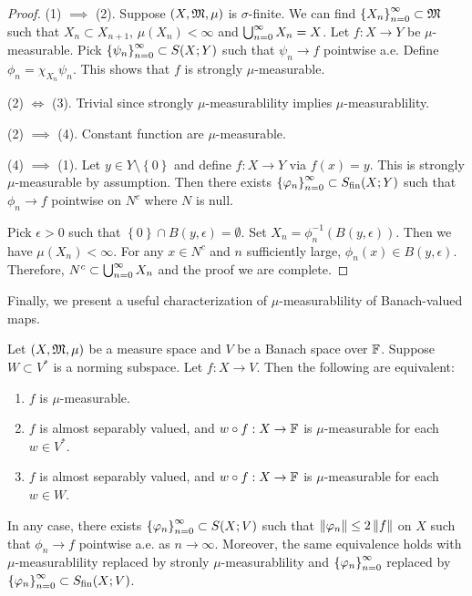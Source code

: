 \documentclass[a4paper]{article}
\begin{document}
\begin{proof}
  (1) $\implies$ (2). Suppose $(X, \mathfrak{M}, \mu)$ is 
  $\sigma$-finite. We can find $\left\{ X_n \right\}_{n=0}^\infty 
  \subset \mathfrak{M}$ such that $X_n \subset X_{n+1}$, 
  $\mu(X_n) < \infty$ and $\bigcup_{n=0}^\infty X_n = X$. 
  Let $f: X \to Y$ be $\mu$-measurable. Pick 
  $\left\{ \psi_n \right\}_{n=0}^\infty \subset S(X; Y)$ such that
  $\psi_n \to f$ pointwise a.e. Define 
  $\phi_n = \chi_{X_n} \psi_n$. This shows that 
  $f$ is strongly $\mu$-measurable.

  (2) $\iff$ (3). Trivial since strongly $\mu$-measurablility
  implies $\mu$-measurablility.

  (2) $\implies$ (4). Constant function are $\mu$-measurable.

  (4) $\implies$ (1). Let $y \in Y \setminus \left\{ 0 \right\}$
  and define $f : X \to Y$ via $f(x) = y$. This 
  is strongly $\mu$-measurable by assumption. 
  Then there exists $\left\{ \varphi_n \right\}_{n=0}^\infty \subset S_{\text{fin}}(X; Y)$ 
  such that $\phi_n \to f$ pointwise on $N^c$ where 
  $N$ is null. 

  Pick $\epsilon > 0$ such that $\left\{ 0 \right\} 
  \cap B(y, \epsilon) = \emptyset$. Set 
  $X_n = \phi_n^{-1} (B(y, \epsilon))$. Then we have 
  $\mu(X_n) < \infty$. For any $x \in N^c$ and $n$ 
  sufficiently large, $\phi_n(x) \in B(y, \epsilon)$.
  Therefore, $N^c \subset \bigcup_{n=0}^\infty X_n$ and 
  the proof we are complete.

\end{proof}

Finally, we present a useful characterization of 
$\mu$-measurablility of Banach-valued maps. 

\begin{thm}[Pettis]
  Let $(X, \mathfrak{M}, \mu)$ be a measure space and $V$ be a 
  Banach space over $\mathbb{F}$. Suppose $W \subset V^*$ is a 
  norming subspace. Let $f: X \to V$. Then the following
  are equivalent:
  \begin{enumerate}
    \item $f$ is $\mu$-measurable.
    \item $f$ is almost separably valued, and $w \circ
    f : X \to \mathbb{F}$ is $\mu$-measurable for each $w \in V^*$.
    \item $f$ is almost separably valued, and $w \circ f: 
    X \to \mathbb{F}$ is $\mu$-measurable for each $w \in W$.
  \end{enumerate}
  In any case, there exists $\left\{ \varphi_n \right\}_{n=0}^\infty \subset S(X; V)
  $ such that $\left\lVert \varphi_n\right\rVert \leq 2 \left\lVert f\right\rVert$ on $X$ such that 
  $\phi_n \to f$ pointwise a.e. as $n \to \infty$. 
  Moreover, the same 
  equivalence holds with $\mu$-measurablility replaced by 
  stronly $\mu$-measurablility and $\left\{ \varphi_n \right\}_{n=0}^\infty$  
  replaced by $\left\{ \varphi_n \right\}_{n=0}^\infty \subset S_{\text{fin}}(X; V)$.
\end{thm}
\end{document}
